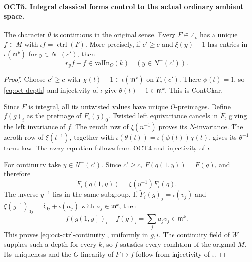 \documentclass[11pt,a4paper]{article}
\numberwithin{equation}{section}
\theoremstyle{remark}\newtheorem{remark}[theorem]{Remark}
\begin{document}
\paragraph{OCT5. Integral classical forms control to the actual ordinary ambient space.}
\label{claim:OCT5}
The character $\theta$ is continuous in the original sense.
Every $F\in\Lambda_c$ has a unique $f\in M$ with
$\iota f=\operatorname{ctrl}(F)$.  More precisely, if $c'\geq c$
and $\xi(y)-1$ has entries in $\iota(\mathfrak m^k)$ for
$y\in N^-(c')$, then
\begin{equation}\label{eq:oct-ctrl-continuity}
                r_yf-f\in\mathrm{valIn}_O(k)
                         \quad(y\in N^-(c')).
\end{equation}
\begin{proof}
Choose $c'\geq c$ with $\chi(t)-1\in\iota(\mathfrak m^k)$
on $T_c(c')$.  There $\phi(t)=1$, so
\eqref{eq:oct-depth} and injectivity of $\iota$ give
$\theta(t)-1\in\mathfrak m^k$.  This is ContChar.

Since $F$ is integral, all its untwisted values have unique
$O$-preimages.  Define $f(g)_i$ as the preimage of
$\widetilde F_i(g)_0$.  Twisted left equivariance cancels in
$\widetilde F$, giving the left invariance of $f$.  The zeroth
row of $\xi(n^{-1})$ proves its $N$-invariance.  The zeroth
row of $\xi(t^{-1})$, together with
$\iota(\theta(t))=\iota(\phi(t))\chi(t)$, gives its
$\theta^{-1}$ torus law.  The away equation follows from OCT4
and injectivity of $\iota$.

For continuity take $y\in N^-(c')$.  Since $c'\geq c$,
$F(g(1,\allowbreak{} y))=F(g)$, and therefore
\[
 \widetilde F_i(g(1,\allowbreak{} y))=\xi(y^{-1})\widetilde F_i(g).
\]
The inverse $y^{-1}$ lies in the same subgroup.  If
$\widetilde F_i(g)_j=\iota(v_j)$ and
$\xi(y^{-1})_{0j}=\delta_{0j}+\iota(a_j)$ with
$a_j\in\mathfrak m^k$, then
\[
                  f(g(1,\allowbreak{} y))_i-f(g)_i=\sum_j a_jv_j
                                                  \in\mathfrak m^k.
\]
This proves \eqref{eq:oct-ctrl-continuity}, uniformly in $g,\allowbreak{} i$.
The continuity field of $W$ supplies such a depth for every $k$,
so $f$ satisfies every condition of the original $M$.  Its
uniqueness and the $O$-linearity of $F\mapsto f$ follow from
injectivity of $\iota$.
\end{proof}

\end{document}
